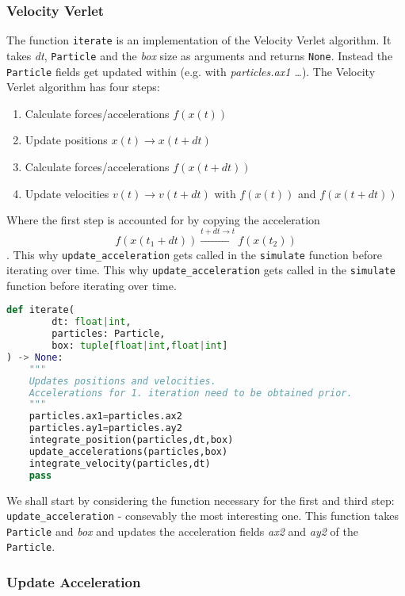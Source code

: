 \documentclass{article}
\begin{document}
\subsubsection{Velocity Verlet}
The function \texttt{iterate} is an implementation of the Velocity Verlet algorithm. It takes \textit{dt}, \texttt{Particle} and the \textit{box} size as arguments and returns \texttt{None}. Instead the \texttt{Particle} fields get updated within (e.g. with \textit{particles.ax1 \dots}). The Velocity Verlet algorithm has four steps:
\begin{enumerate}
    \item Calculate forces/accelerations $f(x(t))$ 
    \item Update positions $x(t) \rightarrow x(t+dt)$ 
    \item Calculate forces/accelerations $f(x(t+dt))$ 
    \item Update velocities $v(t) \rightarrow v(t+dt)$ with $f(x(t))$ and $f(x(t+dt))$
\end{enumerate} 
Where the first step is accounted for by copying the acceleration $$f(x(t_1+dt)) \overset{t+dt \longrightarrow t}{\rightarrow}f(x(t_2))$$. This why \texttt{update\_acceleration} gets called in the \texttt{simulate} function before iterating over time. This why \texttt{update\_acceleration} gets called in the \texttt{simulate} function before iterating over time.
\begin{lstlisting}[language=Python, caption=Iterates the positions by Velocity Verlet]
def iterate(
        dt: float|int,
        particles: Particle,
        box: tuple[float|int,float|int]
) -> None:
    """
    Updates positions and velocities. 
    Accelerations for 1. iteration need to be obtained prior. 
    """
    particles.ax1=particles.ax2
    particles.ay1=particles.ay2
    integrate_position(particles,dt,box)
    update_accelerations(particles,box)
    integrate_velocity(particles,dt)
    pass
\end{lstlisting}
We shall start by considering the function necessary for the first and third step: \texttt{update\_acceleration} - consevably the most interesting one. This function takes \texttt{Particle} and \textit{box} and updates the acceleration fields \textit{ax2} and \textit{ay2} of the \texttt{Particle}. 
\pagebreak
\subsubsection{Update Acceleration}
\end{document}
